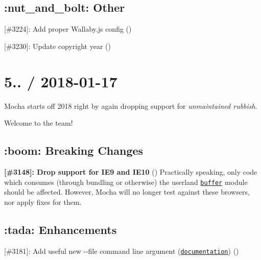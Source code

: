\subsection*{\+:nut\+\_\+and\+\_\+bolt\+: Other}


\begin{DoxyItemize}
\item \mbox{[}\#3224\mbox{]}\+: Add proper Wallaby.\+js config (\href{https://github.com/ArtemGovorov}{\tt })
\item \mbox{[}\#3230\mbox{]}\+: Update copyright year (\href{https://github.com/josephlin55555}{\tt })
\end{DoxyItemize}

\section*{5.. / 2018-\/01-\/17}

Mocha starts off 2018 right by again dropping support for {\itshape unmaintained rubbish}.

Welcome \href{https://github.com/vkarpov15}{\tt } to the team!

\subsection*{\+:boom\+: Breaking Changes}


\begin{DoxyItemize}
\item {\bfseries \mbox{[}\#3148\mbox{]}\+: Drop support for I\+E9 and I\+E10} (\href{https://github.com/Bamieh}{\tt }) Practically speaking, only code which consumes (through bundling or otherwise) the userland \href{https://npm.im/buffer}{\tt buffer} module should be affected. However, Mocha will no longer test against these browsers, nor apply fixes for them.
\end{DoxyItemize}

\subsection*{\+:tada\+: Enhancements}


\begin{DoxyItemize}
\item \mbox{[}\#3181\mbox{]}\+: Add useful new {\ttfamily -\/-\/file} command line argument (\href{https://mochajs.org/#--file-file}{\tt documentation}) (\href{https://github.com/hswolff}{\tt })
\end{DoxyItemize}

